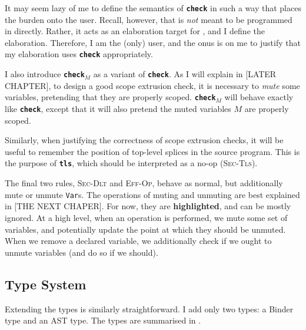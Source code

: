 It may seem lazy of me to define the semantics of \textbf{\texttt{check}} in such a way that places the burden onto the user. Recall, however, that \coreLang{} is \textit{not} meant to be programmed in directly. Rather, it acts as an elaboration target for \sourceLang{}, and I define the elaboration. Therefore, I am the (only) \coreLang{} user, and the onus is on me to justify that my elaboration uses \textbf{\texttt{check}} appropriately. 

I also introduce \textbf{\texttt{check}}$_M$ as a variant of \textbf{\texttt{check}}. As I will explain in [LATER CHAPTER], to design a good scope extrusion check, it is necessary to \textit{mute} some variables, pretending that they are properly scoped. \textbf{\texttt{check}}$_M$ will behave exactly like \textbf{\texttt{check}}, except that it will also pretend the muted variables $M$ are properly scoped.

Similarly, when justifying the correctness of scope extrusion checks, it will be useful to remember the position of top-level splices in the \sourceLang{} source program. This is the purpose of \textbf{\texttt{tls}}, which should be interpreted as a no-op (\textsc{Sec-Tls}).

The final two rules, \textsc{Sec-Dlt} and \textsc{Eff-Op}, behave as normal, but additionally mute or unmute \texttt{Var}s. The operations of muting and unmuting are best explained in [THE NEXT CHAPER]. For now, they are \textbf{\textcolor{coreHighlight}{highlighted}}, and can be mostly ignored. At a high level, when an operation is performed, we mute some set of variables, and potentially update the point at which they should be unmuted. When we remove a declared variable, we additionally check if we ought to unmute variables (and do so if we should).

\subsection{Type System}
Extending the types is similarly straightforward. I add only two types: a \textsf{Binder} type and an \textsf{AST} type. The types are summarised in .
% 

